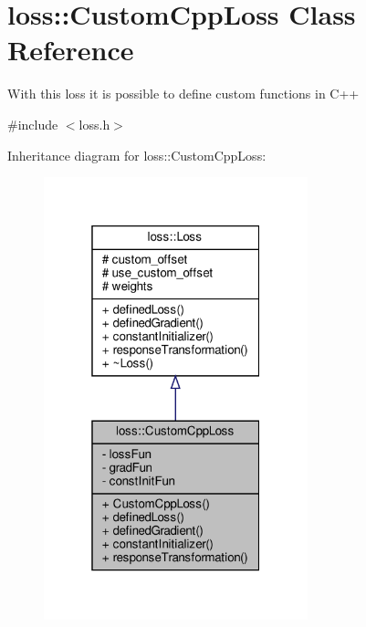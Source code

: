 \hypertarget{classloss_1_1_custom_cpp_loss}{}\section{loss\+:\+:Custom\+Cpp\+Loss Class Reference}
\label{classloss_1_1_custom_cpp_loss}


With this loss it is possible to define custom functions in {\ttfamily C++}  




{\ttfamily \#include $<$loss.\+h$>$}



Inheritance diagram for loss\+:\+:Custom\+Cpp\+Loss\+:\nopagebreak
\begin{figure}[H]
\begin{center}
\leavevmode
\includegraphics[width=217pt]{classloss_1_1_custom_cpp_loss__inherit__graph}
\end{center}
\end{figure}


